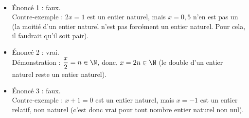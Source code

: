 \ \\ [-5mm]
   \begin{itemize}
      \item Énoncé 1 : {\blue faux.} \\
      Contre-exemple : $2x=1$ est un entier naturel, mais $x=0,5$ n'en est pas un (la moitié d'un entier naturel n'est pas forcément un entier naturel. Pour cela, il faudrait qu'il soit pair).
       \item Énoncé 2 : {\blue vrai.} \\ [1mm]
       Démonstration : $\dfrac{x}{2}=n\in\N$, donc, $x=2n\in\N$ (le double d'un entier naturel reste un entier naturel).
      \item Énoncé 3 : {\blue faux.} \\
      Contre-exemple : $x+1=0$ est un entier naturel, mais $x=-1$ est un entier relatif, non naturel (c'est donc vrai pour tout nombre entier naturel non nul).
   \end{itemize}
